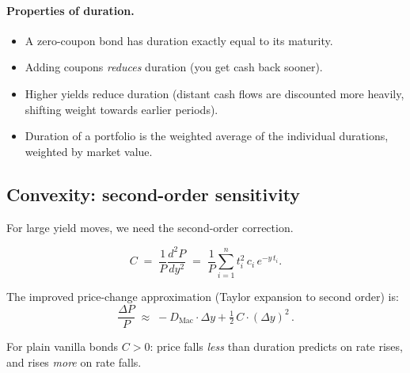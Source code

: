 \paragraph{Properties of duration.}
\begin{itemize}
  \item A zero-coupon bond has duration exactly equal to its maturity.
  \item Adding coupons \emph{reduces} duration (you get cash back
    sooner).
  \item Higher yields reduce duration (distant cash flows are
    discounted more heavily, shifting weight towards earlier periods).
  \item Duration of a portfolio is the weighted average of the
    individual durations, weighted by market value.
\end{itemize}

\subsection{Convexity: second-order sensitivity}

For large yield moves, we need the second-order correction.

\begin{definition}[Convexity]
\begin{equation}
  C \;=\; \frac{1}{P}\frac{d^2 P}{dy^2}
  \;=\; \frac{1}{P}\sum_{i=1}^{n} t_i^2 \, c_i \, e^{-y\,t_i}.
  \label{eq:convexity}
\end{equation}
\end{definition}

The improved price-change approximation (Taylor expansion to second
order) is:
\begin{equation}
  \boxed{\frac{\Delta P}{P}
  \;\approx\; -D_{\text{Mac}} \cdot \Delta y
            + \tfrac{1}{2}\,C \cdot (\Delta y)^2}\,.
  \label{eq:duration_convexity}
\end{equation}

For plain vanilla bonds $C > 0$: price falls \emph{less} than
duration predicts on rate rises, and rises \emph{more} on rate falls.

\begin{center}
\end{center}

